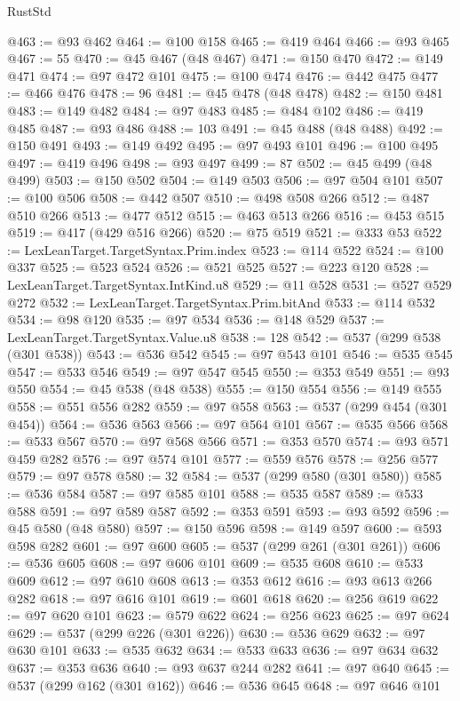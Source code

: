 \begin{lexlean}{RustStd}
\begin{coremodule}
@463 := @93 @462
@464 := @100 @158
@465 := @419 @464
@466 := @93 @465
@467 := 55
@470 := @45 @467 (@48 @467)
@471 := @150 @470
@472 := @149 @471
@474 := @97 @472 @101
@475 := @100 @474
@476 := @442 @475
@477 := @466 @476
@478 := 96
@481 := @45 @478 (@48 @478)
@482 := @150 @481
@483 := @149 @482
@484 := @97 @483
@485 := @484 @102
@486 := @419 @485
@487 := @93 @486
@488 := 103
@491 := @45 @488 (@48 @488)
@492 := @150 @491
@493 := @149 @492
@495 := @97 @493 @101
@496 := @100 @495
@497 := @419 @496
@498 := @93 @497
@499 := 87
@502 := @45 @499 (@48 @499)
@503 := @150 @502
@504 := @149 @503
@506 := @97 @504 @101
@507 := @100 @506
@508 := @442 @507
@510 := @498 @508 @266
@512 := @487 @510 @266
@513 := @477 @512
@515 := @463 @513 @266
@516 := @453 @515
@519 := @417 (@429 @516 @266)
@520 := @75 @519
@521 := @333 @53
@522 := LexLeanTarget.TargetSyntax.Prim.index
@523 := @114 @522
@524 := @100 @337
@525 := @523 @524
@526 := @521 @525
@527 := @223 @120
@528 := LexLeanTarget.TargetSyntax.IntKind.u8
@529 := @11 @528
@531 := @527 @529 @272
@532 := LexLeanTarget.TargetSyntax.Prim.bitAnd
@533 := @114 @532
@534 := @98 @120
@535 := @97 @534
@536 := @148 @529
@537 := LexLeanTarget.TargetSyntax.Value.u8
@538 := 128
@542 := @537 (@299 @538 (@301 @538))
@543 := @536 @542
@545 := @97 @543 @101
@546 := @535 @545
@547 := @533 @546
@549 := @97 @547 @545
@550 := @353 @549
@551 := @93 @550
@554 := @45 @538 (@48 @538)
@555 := @150 @554
@556 := @149 @555
@558 := @551 @556 @282
@559 := @97 @558
@563 := @537 (@299 @454 (@301 @454))
@564 := @536 @563
@566 := @97 @564 @101
@567 := @535 @566
@568 := @533 @567
@570 := @97 @568 @566
@571 := @353 @570
@574 := @93 @571 @459 @282
@576 := @97 @574 @101
@577 := @559 @576
@578 := @256 @577
@579 := @97 @578
@580 := 32
@584 := @537 (@299 @580 (@301 @580))
@585 := @536 @584
@587 := @97 @585 @101
@588 := @535 @587
@589 := @533 @588
@591 := @97 @589 @587
@592 := @353 @591
@593 := @93 @592
@596 := @45 @580 (@48 @580)
@597 := @150 @596
@598 := @149 @597
@600 := @593 @598 @282
@601 := @97 @600
@605 := @537 (@299 @261 (@301 @261))
@606 := @536 @605
@608 := @97 @606 @101
@609 := @535 @608
@610 := @533 @609
@612 := @97 @610 @608
@613 := @353 @612
@616 := @93 @613 @266 @282
@618 := @97 @616 @101
@619 := @601 @618
@620 := @256 @619
@622 := @97 @620 @101
@623 := @579 @622
@624 := @256 @623
@625 := @97 @624
@629 := @537 (@299 @226 (@301 @226))
@630 := @536 @629
@632 := @97 @630 @101
@633 := @535 @632
@634 := @533 @633
@636 := @97 @634 @632
@637 := @353 @636
@640 := @93 @637 @244 @282
@641 := @97 @640
@645 := @537 (@299 @162 (@301 @162))
@646 := @536 @645
@648 := @97 @646 @101

\end{coremodule}
\end{lexlean}
